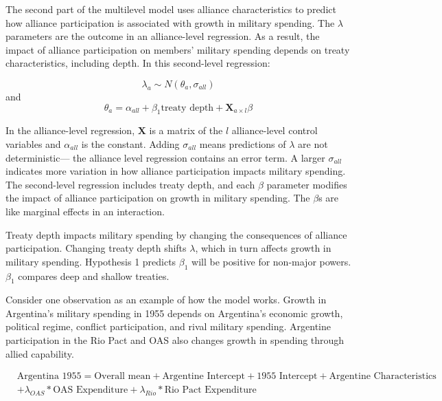\documentclass[12pt]{article}
\begin{document}
The second part of the multilevel model uses alliance characteristics to predict how alliance participation is associated with growth in military spending. 
The $\lambda$ parameters are the outcome in an alliance-level regression.
As a result, the impact of alliance participation on members' military spending depends on treaty characteristics, including depth. 
In this second-level regression: 


\begin{equation}
\lambda_{a} \sim N(\theta_{a}, \sigma_{all})
\end{equation} 
and 
\begin{equation}
\theta_{a} = \alpha_{all} + \beta_1 \mbox{treaty depth} + \textbf{X}_{a \times l} \beta
\end{equation}


In the alliance-level regression, $\textbf{X}$ is a matrix of the $l$ alliance-level control variables and $\alpha_{all}$ is the constant.
Adding $\sigma_{all}$ means predictions of $\lambda$ are not deterministic--- the alliance level regression contains an error term. 
A larger $\sigma_{all}$ indicates more variation in how alliance participation impacts military spending. 
The second-level regression includes treaty depth, and each $\beta$ parameter modifies the impact of alliance participation on growth in military spending. 
The $\beta$s are like marginal effects in an interaction. 


Treaty depth impacts military spending by changing the consequences of alliance participation. 
Changing treaty depth shifts $\lambda$, which in turn affects growth in military spending.
Hypothesis 1 predicts $\beta_1$ will be positive for non-major powers.
$\beta_1$ compares deep and shallow treaties. 


Consider one observation as an example of how the model works. 
Growth in Argentina's military spending in 1955 depends on Argentina's economic growth, political regime, conflict participation, and rival military spending. 
Argentine participation in the Rio Pact and OAS also changes growth in spending through allied capability. 


\begin{equation}
\begin{split}
& \mbox{Argentina 1955} = \mbox{Overall mean}
+ \mbox{Argentine Intercept} + \mbox{1955 Intercept} 
+ \mbox{Argentine Characteristics} \\
& + \lambda_{OAS} * \mbox{OAS Expenditure} + \lambda_{Rio} * \mbox{Rio Pact Expenditure}
\end{split} 
\end{equation}
\end{document}
